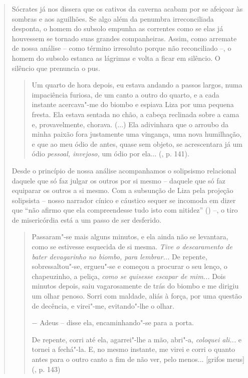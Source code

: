 {\begin{quote}
Sócrates já nos dissera que os cativos da caverna acabam por se afeiçoar
às sombras e aos aguilhões. Se algo além da penumbra irreconciliada
desponta, o homem do subsolo empunha as correntes como se elas já
houvessem se tornado suas grandes companheiras. Assim, como arremate de
nossa análise -- como término irresoluto porque não reconciliado --, o
homem do subsolo estanca as lágrimas e volta a ficar em silêncio. O
silêncio que prenuncia o pus.

\begin{quote}
Um quarto de hora depois, eu estava andando a passos largos, numa
impaciência furiosa, de um canto a outro do quarto, e a cada instante
acercava"-me do biombo e espiava Liza por uma pequena fresta. Ela estava
sentada no chão, a cabeça reclinada sobre a cama e, provavelmente,
chorava. (...) Ela adivinhara que o arroubo da minha paixão fora
justamente uma vingança, uma nova humilhação, e que ao meu ódio de
antes, quase sem objeto, se acrescentara já um ódio \emph{pessoal,
invejoso,} um ódio por ela... (, p. 141).
\end{quote}

Desde o princípio de nossa análise acompanhamos o solipsismo relacional
daquele que só faz julgar os outros por si mesmo -- daquele que só faz
equiparar os outros a si mesmo. Com a subsunção de Liza pela projeção
solipsista -- nosso narrador cínico e cáustico sequer se incomoda em
dizer que ``não afirmo que ela compreendesse tudo isto com nitidez''
() --, o tiro de misericórdia está a um passo de ser desferido.

\begin{quote}
Passaram"-se mais alguns minutos, e ela ainda não se levantara, como se
estivesse esquecida de si mesma. \emph{Tive o descaramento de bater
devagarinho no biombo, para lembrar...} De repente, sobressaltou"-se,
ergueu"-se e começou a procurar o seu lenço, o chapeuzinho, a peliça,
\emph{como se quisesse escapar de mim...} Dois minutos depois, saiu
vagarosamente de trás do biombo e me dirigiu um olhar penoso. Sorri com
maldade, aliás à força, por uma questão de decência, e virei"-me,
evitando"-lhe o olhar.

− Adeus -- disse ela, encaminhando"-se para a porta.

De repente, corri até ela, agarrei"-lhe a mão, abri"-a, \emph{coloquei
ali...} e tornei a fechá"-la. E, no mesmo instante, me virei e corri o
quanto antes para o outro canto a fim de não ver, pelo menos...
{[}grifos meus{]} (, p. 143)
\end{quote}


\end{quote}}
